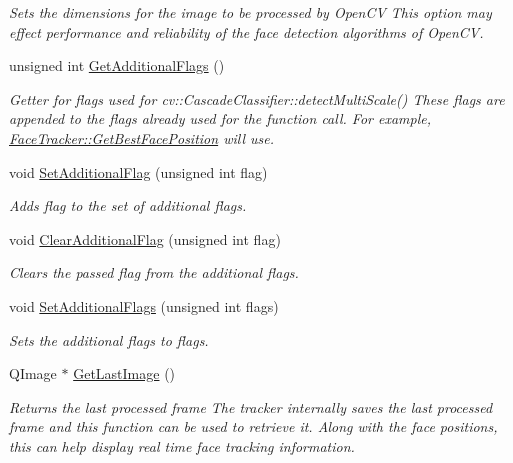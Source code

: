 \begin{DoxyCompactItemize}
\begin{DoxyCompactList}\small\item\em Sets the dimensions for the image to be processed by Open\-C\-V This option may effect performance and reliability of the face detection algorithms of Open\-C\-V. \end{DoxyCompactList}\item 
unsigned int \hyperlink{class_face_tracker_aa89fea2366e81e1b7eeda5de64b72b9a}{Get\-Additional\-Flags} ()
\begin{DoxyCompactList}\small\item\em Getter for flags used for cv\-::\-Cascade\-Classifier\-::detect\-Multi\-Scale() These flags are appended to the flags already used for the function call. For example, \hyperlink{class_face_tracker_aff0b9cfb91df4eac94efe0cbfeae0f4f}{Face\-Tracker\-::\-Get\-Best\-Face\-Position} will use. \end{DoxyCompactList}\item 
void \hyperlink{class_face_tracker_a8efa0e58da5503bb16f21b0b5008af82}{Set\-Additional\-Flag} (unsigned int flag)
\begin{DoxyCompactList}\small\item\em Adds flag to the set of additional flags. \end{DoxyCompactList}\item 
void \hyperlink{class_face_tracker_abf0948b588ae71d555d61506cb8c8a4e}{Clear\-Additional\-Flag} (unsigned int flag)
\begin{DoxyCompactList}\small\item\em Clears the passed flag from the additional flags. \end{DoxyCompactList}\item 
void \hyperlink{class_face_tracker_a99fde78244336b63796b3c0467210213}{Set\-Additional\-Flags} (unsigned int flags)
\begin{DoxyCompactList}\small\item\em Sets the additional flags to flags. \end{DoxyCompactList}\item 
Q\-Image $\ast$ \hyperlink{class_face_tracker_a4f77bdab0b45cf24701ac008c56ce571}{Get\-Last\-Image} ()
\begin{DoxyCompactList}\small\item\em Returns the last processed frame The tracker internally saves the last processed frame and this function can be used to retrieve it. Along with the face positions, this can help display real time face tracking information. \end{DoxyCompactList}\end{DoxyCompactItemize}
